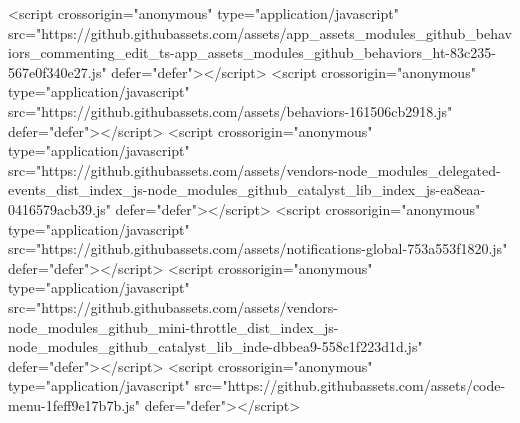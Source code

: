 <script crossorigin="anonymous" type="application/javascript" src="https://github.githubassets.com/assets/app_assets_modules_github_behaviors_commenting_edit_ts-app_assets_modules_github_behaviors_ht-83c235-567e0f340e27.js" defer="defer"></script>
<script crossorigin="anonymous" type="application/javascript" src="https://github.githubassets.com/assets/behaviors-161506cb2918.js" defer="defer"></script>
<script crossorigin="anonymous" type="application/javascript" src="https://github.githubassets.com/assets/vendors-node_modules_delegated-events_dist_index_js-node_modules_github_catalyst_lib_index_js-ea8eaa-0416579acb39.js" defer="defer"></script>
<script crossorigin="anonymous" type="application/javascript" src="https://github.githubassets.com/assets/notifications-global-753a553f1820.js" defer="defer"></script>
<script crossorigin="anonymous" type="application/javascript" src="https://github.githubassets.com/assets/vendors-node_modules_github_mini-throttle_dist_index_js-node_modules_github_catalyst_lib_inde-dbbea9-558c1f223d1d.js" defer="defer"></script>
<script crossorigin="anonymous" type="application/javascript" src="https://github.githubassets.com/assets/code-menu-1feff9e17b7b.js" defer="defer"></script>
  
